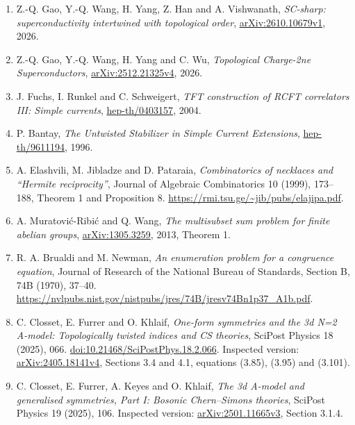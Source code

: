 \documentclass[
  11pt,
]{article}
\providecommand{\tightlist}{%
  \setlength{\itemsep}{0pt}\setlength{\parskip}{0pt}}
\begin{document}
\begin{enumerate}
\def\labelenumi{\arabic{enumi}.}
\tightlist
\item
  Z.-Q. Gao, Y.-Q. Wang, H. Yang, Z. Han and A. Vishwanath,
  \emph{SC-sharp: superconductivity intertwined with topological order},
  \href{https://arxiv.org/html/2610.10679v1}{arXiv:2610.10679v1}, 2026.
\item
  Z.-Q. Gao, Y.-Q. Wang, H. Yang and C. Wu, \emph{Topological Charge-2ne
  Superconductors},
  \href{https://arxiv.org/html/2512.21325v4}{arXiv:2512.21325v4}, 2026.
\item
  J. Fuchs, I. Runkel and C. Schweigert, \emph{TFT construction of RCFT
  correlators III: Simple currents},
  \href{https://arxiv.org/pdf/hep-th/0403157}{hep-th/0403157}, 2004.
\item
  P. Bantay, \emph{The Untwisted Stabilizer in Simple Current
  Extensions},
  \href{https://arxiv.org/pdf/hep-th/9611194}{hep-th/9611194}, 1996.
\item
  A. Elashvili, M. Jibladze and D. Pataraia,
  \emph{Combinatorics of necklaces and ``Hermite reciprocity''},
  Journal of Algebraic Combinatorics 10 (1999), 173--188,
  Theorem 1 and Proposition 8.
  \url{https://rmi.tsu.ge/~jib/pubs/elajipa.pdf}.
\item
  A. Muratovi\'c-Ribi\'c and Q. Wang,
  \emph{The multisubset sum problem for finite abelian groups},
  \href{https://arxiv.org/pdf/1305.3259}{arXiv:1305.3259}, 2013,
  Theorem 1.
\item
  R. A. Brualdi and M. Newman, \emph{An enumeration problem for a
  congruence equation}, Journal of Research of the National Bureau of
  Standards, Section B, 74B (1970), 37--40.
  \url{https://nvlpubs.nist.gov/nistpubs/jres/74B/jresv74Bn1p37_A1b.pdf}.
\item
  C. Closset, E. Furrer and O. Khlaif, \emph{One-form symmetries and
  the 3d N=2 A-model: Topologically twisted indices and CS theories},
  SciPost Physics 18 (2025), 066.
  \href{https://doi.org/10.21468/SciPostPhys.18.2.066}{doi:10.21468/SciPostPhys.18.2.066}.
  Inspected version: \href{https://arxiv.org/html/2405.18141v4}{arXiv:2405.18141v4},
  Sections 3.4 and 4.1, equations (3.85), (3.95) and (3.101).
\item
  C. Closset, E. Furrer, A. Keyes and O. Khlaif,
  \emph{The 3d A-model and generalised symmetries, Part I: Bosonic
  Chern--Simons theories}, SciPost Physics 19 (2025), 106.
  Inspected version: \href{https://arxiv.org/html/2501.11665v3}{arXiv:2501.11665v3},
  Section 3.1.4.
\end{enumerate}
\end{document}

